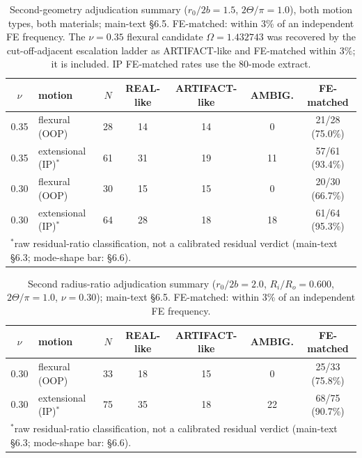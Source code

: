 \documentclass[11pt]{article}
\begin{document}
\begin{table}[!htbp]\centering\small
\caption{Second-geometry adjudication summary ($r_0/2b=1.5$,
$2\Theta/\pi=1.0$), both motion types, both materials; main-text \S6.5.
FE-matched: within 3\% of an independent FE frequency. The $\nu=0.35$
flexural candidate $\Omega=1.432743$ was recovered by the
cut-off-adjacent escalation ladder as ARTIFACT-like and FE-matched
within $3\%$; it is included. IP FE-matched rates use the 80-mode
extract.}
\label{tab:r150a100}
\begin{tabular}{clccccc}
\toprule $\nu$ & motion & $N$ & REAL-like & ARTIFACT-like & AMBIG. & FE-matched\\ \midrule
0.35 & flexural (OOP)    & 28 & 14 & 14 & 0  & 21/28 (75.0\%)\\
0.35 & extensional (IP)$^\ast$  & 61 & 31 & 19 & 11 & 57/61 (93.4\%)\\
0.30 & flexural (OOP)    & 30 & 15 & 15 & 0  & 20/30 (66.7\%)\\
0.30 & extensional (IP)$^\ast$  & 64 & 28 & 18 & 18 & 61/64 (95.3\%)\\
\bottomrule
\multicolumn{7}{l}{\footnotesize $^\ast$raw residual-ratio classification, not a calibrated residual verdict (main-text \S6.3; mode-shape bar: \S6.6).}\\
\end{tabular}
\end{table}

\begin{table}[!htbp]\centering\small
\caption{Second radius-ratio adjudication summary ($r_0/2b=2.0$,
$R_i/R_o=0.600$, $2\Theta/\pi=1.0$, $\nu=0.30$); main-text \S6.5.
FE-matched: within 3\% of an independent FE frequency.}
\label{tab:r200a100}
\begin{tabular}{clccccc}
\toprule $\nu$ & motion & $N$ & REAL-like & ARTIFACT-like & AMBIG. & FE-matched\\ \midrule
0.30 & flexural (OOP)    & 33 & 18 & 15 & 0  & 25/33 (75.8\%)\\
0.30 & extensional (IP)$^\ast$  & 75 & 35 & 18 & 22 & 68/75 (90.7\%)\\
\bottomrule
\multicolumn{7}{l}{\footnotesize $^\ast$raw residual-ratio classification, not a calibrated residual verdict (main-text \S6.3; mode-shape bar: \S6.6).}\\
\end{tabular}
\end{table}
\end{document}
